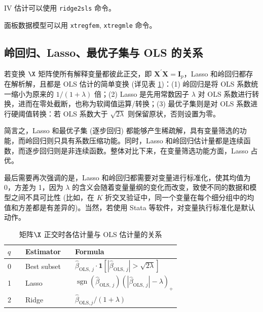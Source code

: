 IV 估计可以使用 \texttt{ridge2sls} 命令。 

面板数据模型可以用 \texttt{xtregfem}, \texttt{xtregmle} 命令。 

\subsection{岭回归、Lasso、最优子集与 OLS 的关系}



若变换 $\X$ 矩阵使所有解释变量都彼此正交，即 $\boldsymbol{X}^{\prime} \boldsymbol{X}=\boldsymbol{I}_{p}$，Lasso 和岭回归都存在解析解，且都是 OLS 估计的简单变换 (详见表 \ref{tab:lasso-01})：(1) 岭回归是将 OLS 系数统一缩小为原来的 $1/(1+\lambda)$ 倍；(2) Lasso 是先用常数因子 $\lambda$ 对 OLS 系数进行转换，进而在零处截断，也称为软阈值运算/转换；(3) 最优子集则是对 OLS 系数进行硬阈值转换：若 OLS 系数大于 $\sqrt{2 \lambda}$ 则保留原状，否则设置为零。

简言之，Lasso 和最优子集 (逐步回归) 都能够产生稀疏解，具有变量筛选的功能，而岭回归则只具有系数压缩功能。同时，Lasso 和岭回归估计量都是连续函数，而逐步回归则是非连续函数。整体对比下来，在变量筛选功能方面，Lasso 占优。

最后需要再次强调的是，Lasso 和岭回归都需要对变量进行标准化，使其均值为 0，方差为 1，因为 $\lambda$ 的含义会随着变量量纲的变化而改变，致使不同的数据和模型之间不具可比性 (比如，在 $K$ 折交叉验证中，同一个变量在每个细分组中的均值和方差都是有差异的)。当然，若使用 Stata 等软件，对变量执行标准化是默认动作。 

\begin{table}
  \begin{center}
	\caption{矩阵$\X$ 正交时各估计量与 OLS 估计量的关系%
	}%
	\label{tab:lasso-01}
	\renewcommand\arraystretch{1.3}
  \begin{tabular}{lllll}
\hline$q$ & &Estimator & \quad &Formula \\
\hline 0 & &Best subset & \quad & $\widehat{\beta}_{\text{OLS},\,j} \cdot \mathbf{1}[|\widehat{\beta}_{\text{OLS},\,j}|>\sqrt{2 \lambda}]$ \\
1 & &Lasso & \quad &$\operatorname{sgn}(\widehat{\beta}_{\text{OLS},\,j})
(|\widehat{\beta}_{\text{OLS},\,j}|-\lambda)_{+}$ \\
2 & &Ridge & \quad &$\widehat{\beta}_{\text{OLS}, j} /(1+\lambda)$ \\
\hline
  \end{tabular} 
  \end{center}
\end{table}


